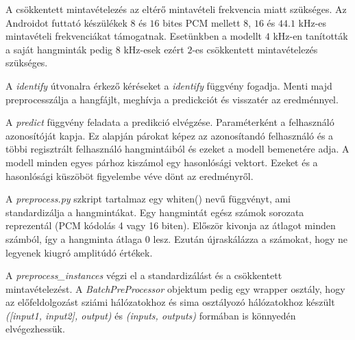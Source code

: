 A csökkentett mintavételezés az eltérő mintavételi frekvencia miatt szükséges. Az Androidot futtató készülékek $8$ és $16$ bites PCM mellett $8$, $16$ és $44.1$ kHz-es mintavételi frekvenciákat támogatnak. Esetünkben a modellt $4$ kHz-en tanították a saját hangminták pedig $8$ kHz-esek ezért $2$-es csökkentett mintavételezés szükséges.

A \emph{identify} útvonalra érkező kéréseket a \emph{identify} függvény fogadja. Menti majd preprocesszálja a hangfájlt, meghívja a predickciót és visszatér az eredménnyel.

A \emph{predict} függvény feladata a predikció elvégzése. Paraméterként a felhasználó azonosítóját kapja. Ez alapján párokat képez az azonosítandó felhasználó és a többi regisztrált felhasználó hangmintáiból és ezeket a modell bemenetére adja. A modell minden egyes párhoz kiszámol egy hasonlósági vektort. Ezeket és a hasonlósági küszöböt figyelembe véve dönt az eredményről.
\newline

A \emph{preprocess.py} szkript tartalmaz egy whiten() nevű függvényt, ami standardizálja a hangmintákat. Egy hangmintát egész számok sorozata reprezentál (PCM kódolás 4 vagy 16 biten). Először kivonja az átlagot minden számból, így a hangminta átlaga 0 lesz. Ezután újraskálázza a számokat, hogy ne legyenek kiugró amplitúdó értékek.

A \emph{preprocess\_instances} végzi el a standardizálást és a csökkentett mintavételezést. A \emph{BatchPreProcessor} objektum pedig egy wrapper osztály, hogy az előfeldolgozást sziámi hálózatokhoz és sima osztályozó hálózatokhoz készült \emph{([input1, input2], output)} és \emph{(inputs, outputs)} formában is könnyedén elvégezhessük.